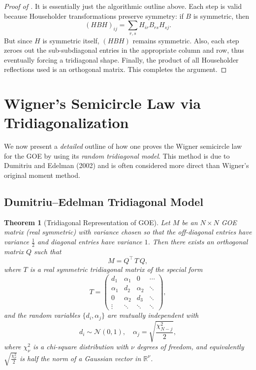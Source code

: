 \documentclass[letterpaper,11pt,oneside,reqno]{article}
\numberwithin{equation}{section}
\newtheorem{theorem}[proposition]{Theorem}
\theoremstyle{definition}
\begin{document}
\begin{proof}[Proof of ]
It is essentially just the algorithmic outline above.  Each step is valid because Householder transformations preserve symmetry: if \(B\) is symmetric, then
\[
  (H B H)_{ij}
  = \sum_{r,s} H_{ir} B_{rs} H_{sj}.
\]
But since \(H\) is symmetric itself, \((H B H)\) remains symmetric.  Also, each step zeroes out the sub-subdiagonal entries in the appropriate column and row, thus eventually forcing a tridiagonal shape.  Finally, the product of all Householder reflections used is an orthogonal matrix. This completes the argument.
\end{proof}

\section{Wigner’s Semicircle Law via Tridiagonalization}
\label{sec:Wigner-SC-detailed}

We now present a \emph{detailed} outline of how one proves the Wigner semicircle law for the GOE by using its \emph{random tridiagonal model}. This method is due to Dumitriu and Edelman (2002) and is often considered more direct than Wigner’s original moment method.

\subsection{Dumitriu–Edelman Tridiagonal Model}

\begin{theorem}[Tridiagonal Representation of GOE]
\label{thm:DE-model}
Let \(M\) be an \(N\times N\) GOE matrix (real symmetric) with variance chosen so that the off-diagonal entries have variance \(\tfrac12\) and diagonal entries have variance \(1\).  Then there exists an orthogonal matrix \(Q\) such that
\[
   M = Q^\top\,T\,Q,
\]
where \(T\) is a real symmetric tridiagonal matrix of the special form
\[
   T = \begin{pmatrix}
         d_1 & \alpha_1 & 0 & \cdots \\
         \alpha_1 & d_2 & \alpha_2 & \ddots \\
         0 & \alpha_2 & d_3 & \ddots \\
         \vdots & \ddots & \ddots & \ddots
       \end{pmatrix},
\]
and the random variables \(\{d_i,\alpha_j\}\) are mutually independent with
\[
  d_i \sim \mathcal{N}(0,1),
  \quad
  \alpha_j = \sqrt{\frac{\chi^2_{N-j}}{2}},
\]
where \(\chi^2_{\nu}\) is a chi-square distribution with \(\nu\) degrees of freedom, and equivalently \(\sqrt{\tfrac{\chi^2_\nu}{2}}\) is half the norm of a Gaussian vector in \(\mathbb{R}^\nu\).
\end{theorem}
\end{document}
